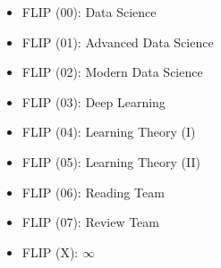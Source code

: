 \documentclass{tikzposter} %
\begin{document}
\begin{columns}
{\begin{minipage}[l]{0.6\linewidth}
{\begin{tikzpicture}[ every annotation/.style = {draw,
						fill = white}]
					\end{tikzpicture}
				}
			\end{minipage}
			\hfill
			\hspace{-0.005\textwidth}
			\begin{minipage}[l]{0.35\linewidth}
				\vspace{-30pt}
				\begin{center}
					\begin{description}[font=\small]			
						\item[Flipper] \hfill
						\begin{itemize}
							\footnotesize 
							\item FLIP (00): Data Science
							\item FLIP (01): Advanced Data Science
						\end{itemize}
						\item[Trainee] \hfill
						\begin{itemize}
							\footnotesize 
							\item FLIP (02): Modern Data Science
							\item FLIP (03): Deep Learning
						\end{itemize}
						\item[$\infty$] \hfill
						\begin{itemize}
							\footnotesize 
							\item FLIP (04): Learning Theory (I)
							\item FLIP (05): Learning Theory (II)
							\item FLIP (06): Reading Team
							\item FLIP (07): Review Team
							\item FLIP (X): $\infty$
						\end{itemize}
					\end{description}
				\end{center}				
			\end{minipage}
		}
		
		
		
		

\end{columns}
\end{document}
